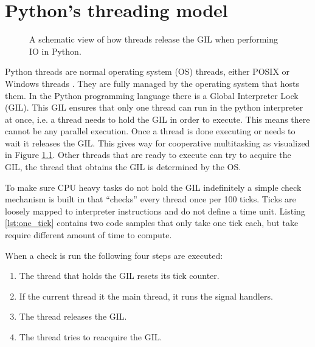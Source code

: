 \chapter{Python's threading model}
\label{cpt:pythons_thread_model}

\begin{figure}[t!]
	\caption{A schematic view of how threads release the GIL when performing IO in Python.}
	\label{fig:python_threads_release_gil}
\end{figure}

Python threads are normal operating system (OS) threads, either POSIX or Windows threads \cite{beazley2010understanding, beazley2009inside}.
They are fully managed by the operating system that hosts them.
In the Python programming language there is a Global Interpreter Lock (GIL).
This GIL ensures that only one thread can run in the python interpreter at once, i.e. a thread needs to hold the GIL in order to execute.
This means there cannot be any parallel execution.
Once a thread is done executing or needs to wait it releases the GIL.
This gives way for cooperative multitasking as visualized in Figure \ref{fig:python_threads_release_gil}.
Other threads that are ready to execute can try to acquire the GIL, the thread that obtains the GIL is determined by the OS.

To make sure CPU heavy tasks do not hold the GIL indefinitely a simple check mechanism is built in that ``checks'' every thread once per 100 ticks.
Ticks are loosely mapped to interpreter instructions and do not define a time unit.
Listing \ref{lst:one_tick} contains two code samples that only take one tick each, but take require different amount of time to compute.



When a check is run the following four steps are executed:
\begin{enumerate}
	\item The thread that holds the GIL resets its tick counter.
	\item If the current thread it the main thread, it runs the signal handlers.
	\item The thread releases the GIL.
	\item The thread tries to reacquire the GIL.
\end{enumerate}

